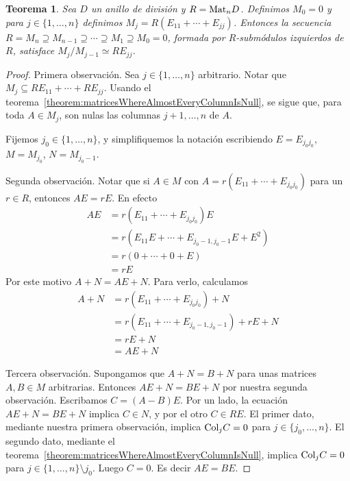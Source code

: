 \documentclass{report}
\newcommand{\Mat}{\textnormal{Mat}}
\newcommand{\Col}{\textnormal{Col}}
\newtheorem{theorem}{Teorema}
\begin{document}
  \begin{theorem}\label{theorem:compositionSeriesOfLeftModulesForMatrixRing}
    Sea \(D\) un anillo de división y \(R = \Mat_n D\).
    Definimos \(M_0 = 0\) y para \(j \in \{1, \dots, n\}\) definimos \(M_j = R (E_{1 1} + \cdots + E_{j j})\).
    Entonces la secuencia \(R = M_n \supseteq M_{n - 1} \supseteq \cdots \supseteq M_1 \supseteq M_0 = 0\), formada por \(R\)-submódulos izquierdos de \(R\), satisface \(M_j / M_{j - 1} \simeq R E_{j j}\).
  \end{theorem}
  \begin{proof}
    Primera observación.
    Sea \(j \in \{1, \dots, n\}\) arbitrario.
    Notar que \(M_j \subseteq R E_{1 1} + \cdots + R E_{j j}\).
    Usando el teorema~\ref{theorem:matricesWhereAlmostEveryColumnIsNull}, se sigue que, para toda \(A \in M_j\), son nulas las columnas \(j + 1, \dots, n\) de \(A\).

    Fijemos \(j_0 \in \{1, \dots, n\}\), y simplifiquemos la notación escribiendo \(E = E_{j_0 j_0}\), \(M = M_{j_0}\), \(N = M_{j_0 - 1}\).

    Segunda observación.
    Notar que si \(A \in M\) con \(A = r (E_{1 1} + \cdots + E_{j_0 j_0})\) para un \(r \in R\), entonces \(A E = r E\).
    En efecto
    \begin{align}
      A E
      &=
      r (E_{11} + \cdots + E_{j_0 j_0}) E
      \\
      &=
      r (E_{11} E + \cdots + E_{j_0 - 1, j_0 - 1} E + E^2)
      \\
      &=
      r (0 + \cdots + 0 + E)
      \\
      &=
      r E
    \end{align}
    Por este motivo \(A + N = A E + N\).
    Para verlo, calculamos
    \begin{align}
      A + N
      &=
      r (E_{1 1} + \cdots + E_{j_0 j_0}) + N
      \\
      &=
      r(E_{1 1} + \cdots + E_{j_0 - 1, j_0 - 1}) + r E + N
      \\
      &=
      r E + N
      \\
      &=
      A E + N
    \end{align}

    Tercera observación.
    Supongamos que \(A + N = B + N\) para unas matrices \(A, B \in M\) arbitrarias.
    Entonces \(A E + N = B E + N\) por nuestra segunda observación.
    Escribamos \(C = (A - B) E\).
    Por un lado, la ecuación \(A E + N = B E + N\) implica \(C \in N\), y por el otro \(C \in R E\).
    El primer dato, mediante nuestra primera observación, implica \(\Col_j C = 0\) para \(j \in \{j_0, \dots, n\}\).
    El segundo dato, mediante el teorema~\ref{theorem:matricesWhereAlmostEveryColumnIsNull}, implica \(\Col_j C = 0\) para \(j \in \{1, \dots, n\} \setminus j_0\).
    Luego \(C = 0\).
    Es decir \(A E = B E\).


\end{proof}
\end{document}
